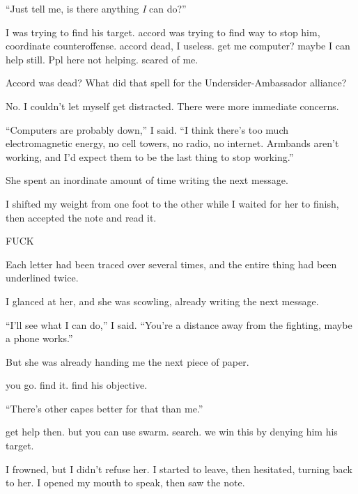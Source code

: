 ``Just tell me, is there anything \emph{I }can do?''



I was trying to find his target.  accord was trying to find way to stop him, coordinate counteroffense.  accord dead, I useless.  get me computer?  maybe I can help still.  Ppl here not helping.  scared of me.



Accord was dead?  What did that spell for the Undersider-Ambassador alliance?



No.  I couldn't let myself get distracted.  There were more immediate concerns.



``Computers are probably down,'' I said.  ``I think there's too much electromagnetic energy, no cell towers, no radio, no internet.  Armbands aren't working, and I'd expect them to be the last thing to stop working.''



She spent an inordinate amount of time writing the next message.



I shifted my weight from one foot to the other while I waited for her to finish, then accepted the note and read it.



FUCK



Each letter had been traced over several times, and the entire thing had been underlined twice.



I glanced at her, and she was scowling, already writing the next message.



``I'll see what I can do,'' I said.  ``You're a distance away from the fighting, maybe a phone works.''



But she was already handing me the next piece of paper.



you go.  find it.  find his objective.



``There's other capes better for that than me.''



get help then.  but you can use swarm.  search.  we win this by denying him his target.



I frowned, but I didn't refuse her.  I started to leave, then hesitated, turning back to her.  I opened my mouth to speak, then saw the note.



